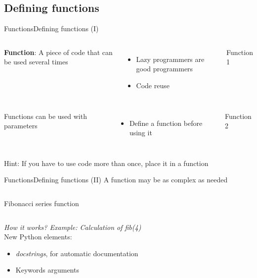 \documentclass[10pt,compress]{beamer} %
\begin{document}
\subsection{Defining functions}
\begin{frame}{Functions}{Defining functions (I)}
    \begin{columns}
	\textbf{Function}: A piece of code that can be used several times
		\begin{itemize}
		\item Lazy programmers are good programmers
		\item Code reuse
		\end{itemize}
		\begin{block}{Function 1}
		\vspace{-0.2cm}
		
		\vspace{-0.2cm}
		\end{block}
	\end{columns}

    \begin{columns}
	Functions can be used with parameters
		\begin{itemize}
		\item Define a function before using it
		\end{itemize}

		\begin{block}{Function 2}
		\vspace{-0.2cm}
		
		\vspace{-0.2cm}
		\end{block}
	\end{columns}
	\bigskip
	\centering \alert{Hint: If you have to use code more than once, place it in a function}
\end{frame}




\begin{frame}{Functions}{Defining functions (II)}
	A function may be as complex as needed
    \begin{columns}
		\vspace{-0.2cm}
		\begin{block}{Fibonacci series function}
		\vspace{-0.2cm}
		
		\end{block}
	\end{columns}
	\vspace{0.3cm}
	\hspace{1cm} \small \textit{\alert{How it works? Example: Calculation of fib(4)}}\\
	\medskip
	New Python elements:
	\begin{itemize}
		\item \small \textit{docstrings}, for automatic documentation
		\item \small Keywords arguments
	\end{itemize}
\end{frame}
\end{document}
